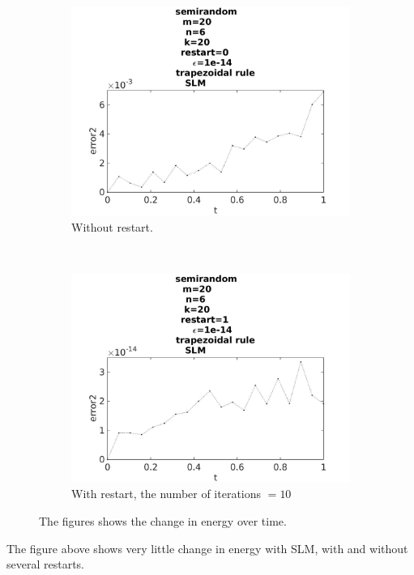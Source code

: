 \begin{figure}[H]
        \begin{subfigure}[b]{0.45\textwidth}
                \includegraphics[width=\textwidth]{../MATLAB/fig/errortestrestart0.jpg}
                \caption{ Without restart. }
                \label{fig:energytestrestart0}
        \end{subfigure}
        ~
        \begin{subfigure}[b]{0.45\textwidth}
                \includegraphics[width=\textwidth]{../MATLAB/fig/errortestrestart1.jpg}
                \caption{ With restart, the number of iterations $= 10$ }
                \label{fig:energytestrestart1}
        \end{subfigure}
        
        
        \caption{ The figures shows the change in energy over time.}
        \label{fig:energytestrestart}
\end{figure}
The figure above shows very little change in energy with SLM, with and without several restarts. \\

